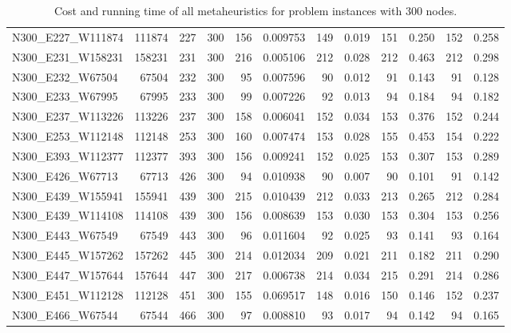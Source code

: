 \begin{landscape}
\begin{table}
\begin{tabular}{lrrrrrrrrrrr}
N300\_E227\_W111874 &       111874 &   227 &   300 &  156 &  0.009753 &    149 &   0.019 &   151 &   0.250 &  152 &   0.258 \\
N300\_E231\_W158231 &       158231 &   231 &   300 &  216 &  0.005106 &    212 &   0.028 &   212 &   0.463 &  212 &   0.298 \\
N300\_E232\_W67504  &        67504 &   232 &   300 &   95 &  0.007596 &     90 &   0.012 &    91 &   0.143 &   91 &   0.128 \\
N300\_E233\_W67995  &        67995 &   233 &   300 &   99 &  0.007226 &     92 &   0.013 &    94 &   0.184 &   94 &   0.182 \\
N300\_E237\_W113226 &       113226 &   237 &   300 &  158 &  0.006041 &    152 &   0.034 &   153 &   0.376 &  152 &   0.244 \\
N300\_E253\_W112148 &       112148 &   253 &   300 &  160 &  0.007474 &    153 &   0.028 &   155 &   0.453 &  154 &   0.222 \\
N300\_E393\_W112377 &       112377 &   393 &   300 &  156 &  0.009241 &    152 &   0.025 &   153 &   0.307 &  153 &   0.289 \\
N300\_E426\_W67713  &        67713 &   426 &   300 &   94 &  0.010938 &     90 &   0.007 &    90 &   0.101 &   91 &   0.142 \\
N300\_E439\_W155941 &       155941 &   439 &   300 &  215 &  0.010439 &    212 &   0.033 &   213 &   0.265 &  212 &   0.284 \\
N300\_E439\_W114108 &       114108 &   439 &   300 &  156 &  0.008639 &    153 &   0.030 &   153 &   0.304 &  153 &   0.256 \\
N300\_E443\_W67549  &        67549 &   443 &   300 &   96 &  0.011604 &     92 &   0.025 &    93 &   0.141 &   93 &   0.164 \\
N300\_E445\_W157262 &       157262 &   445 &   300 &  214 &  0.012034 &    209 &   0.021 &   211 &   0.182 &  211 &   0.290 \\
N300\_E447\_W157644 &       157644 &   447 &   300 &  217 &  0.006738 &    214 &   0.034 &   215 &   0.291 &  214 &   0.286 \\
N300\_E451\_W112128 &       112128 &   451 &   300 &  155 &  0.069517 &    148 &   0.016 &   150 &   0.146 &  152 &   0.237 \\
N300\_E466\_W67544  &        67544 &   466 &   300 &   97 &  0.008810 &     93 &   0.017 &    94 &   0.142 &   94 &   0.165 \\
\bottomrule
\end{tabular}
\caption{Cost and running time of all metaheuristics for problem instances with 300 nodes.}
\label{table:300-results}
\end{table}


\end{landscape}
